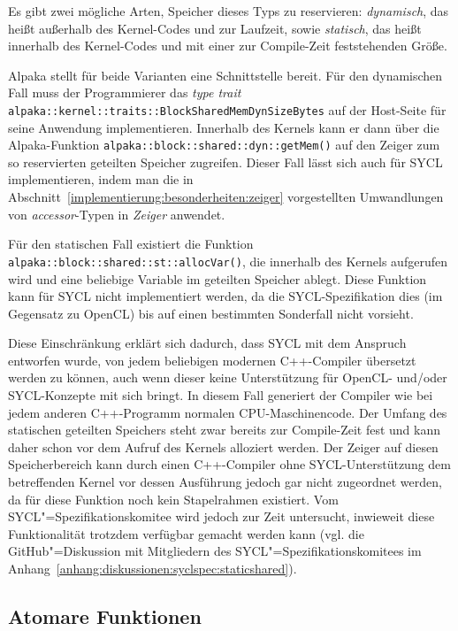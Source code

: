 Es gibt zwei mögliche Arten, Speicher dieses Typs zu reservieren:
\textit{dynamisch}, das heißt außerhalb des Kernel-Codes und zur Laufzeit, sowie
\textit{statisch}, das heißt innerhalb des Kernel-Codes und mit einer zur
Compile-Zeit feststehenden Größe.

Alpaka stellt für beide Varianten eine Schnittstelle bereit. Für den dynamischen
Fall muss der Programmierer das \textit{type trait}
\texttt{alpaka::kernel::traits::BlockSharedMemDynSizeBytes} auf der Host-Seite
für seine Anwendung implementieren. Innerhalb des Kernels kann er dann über die
Alpaka-Funktion \texttt{alpaka::block::shared::dyn::getMem()} auf den Zeiger
zum so reservierten geteilten Speicher zugreifen. Dieser Fall lässt sich auch
für SYCL implementieren, indem man die in
Abschnitt~\ref{implementierung:besonderheiten:zeiger} vorgestellten
Umwandlungen von \textit{accessor}-Typen in \textit{Zeiger} anwendet.

Für den statischen Fall existiert die Funktion
\texttt{alpaka::block::shared::st::allocVar()}, die innerhalb des Kernels
aufgerufen wird und eine beliebige Variable im geteilten Speicher ablegt. Diese
Funktion kann für SYCL nicht implementiert werden, da die SYCL-Spezifikation
dies (im Gegensatz zu OpenCL) bis auf einen bestimmten Sonderfall
\cite[siehe][Abschnitt 4.8.5.3]{sycl2019} nicht vorsieht.

Diese Einschränkung erklärt sich dadurch, dass SYCL mit dem Anspruch entworfen
wurde, von jedem beliebigen modernen C++-Compiler übersetzt werden zu können,
auch wenn dieser keine Unterstützung für OpenCL- und/oder SYCL-Konzepte mit sich
bringt. In diesem Fall generiert der Compiler wie bei jedem anderen C++-Programm
normalen CPU-Maschinencode. Der Umfang des statischen geteilten Speichers steht
zwar bereits zur Compile-Zeit fest und kann daher schon vor dem Aufruf des
Kernels alloziert werden. Der Zeiger auf diesen Speicherbereich kann durch einen
C++-Compiler ohne SYCL-Unterstützung dem betreffenden Kernel vor dessen
Ausführung jedoch gar nicht zugeordnet werden, da für diese Funktion noch kein
Stapelrahmen existiert. Vom SYCL"=Spezifikationskomitee wird jedoch zur Zeit
untersucht, inwieweit diese Funktionalität trotzdem verfügbar gemacht werden
kann (vgl. die GitHub"=Diskussion mit Mitgliedern des
SYCL"=Spezifikationskomitees im
Anhang~\ref{anhang:diskussionen:syclspec:staticshared}).

\subsection{Atomare Funktionen}\label{implementierung:probleme:atomics}

